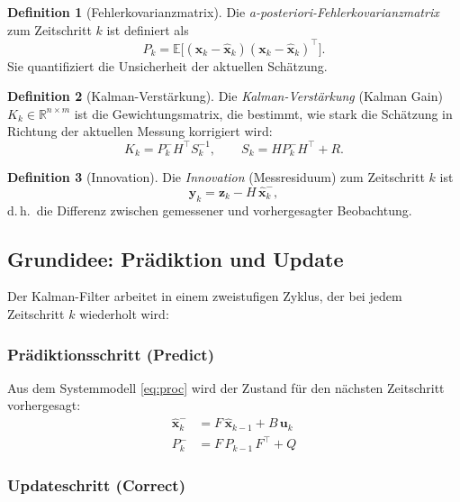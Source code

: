 ﻿\documentclass[a4paper,12pt]{article}
\theoremstyle{definition}
\newtheorem{definition}{Definition}
\begin{document}
\begin{definition}[Fehlerkovarianzmatrix]
    Die \emph{a-posteriori-Fehlerkovarianzmatrix} zum Zeitschritt $k$ ist definiert als
    \[
        P_k = \mathbb{E}\bigl[(\mathbf{x}_k - \hat{\mathbf{x}}_k)
                              (\mathbf{x}_k - \hat{\mathbf{x}}_k)^\top\bigr].
    \]
    Sie quantifiziert die Unsicherheit der aktuellen Schätzung.
\end{definition}

\begin{definition}[Kalman-Verstärkung]
    Die \emph{Kalman-Verstärkung} (Kalman Gain) $K_k \in \mathbb{R}^{n \times m}$ ist
    die Gewichtungsmatrix, die bestimmt, wie stark die Schätzung in Richtung der
    aktuellen Messung korrigiert wird:
    \[
        K_k = P_k^- H^\top S_k^{-1},
        \qquad S_k = H P_k^- H^\top + R.
    \]
\end{definition}

\begin{definition}[Innovation]
    Die \emph{Innovation} (Messresiduum) zum Zeitschritt $k$ ist
    \[
        \mathbf{y}_k = \mathbf{z}_k - H\,\hat{\mathbf{x}}_k^-,
    \]
    d.\,h.\ die Differenz zwischen gemessener und vorhergesagter Beobachtung.
\end{definition}

\subsection{Grundidee: Prädiktion und Update}

Der Kalman-Filter arbeitet in einem zweistufigen Zyklus, der bei jedem Zeitschritt $k$
wiederholt wird:

\subsubsection{Prädiktionsschritt (Predict)}

Aus dem Systemmodell \eqref{eq:proc} wird der Zustand für den nächsten Zeitschritt
vorhergesagt:
\begin{align}
    \hat{\mathbf{x}}_k^- &= F\,\hat{\mathbf{x}}_{k-1} + B\,\mathbf{u}_k
        \label{eq:pred_state} \\
    P_k^- &= F\,P_{k-1}\,F^\top + Q
        \label{eq:pred_cov}
\end{align}

\subsubsection{Updateschritt (Correct)}
\end{document}
